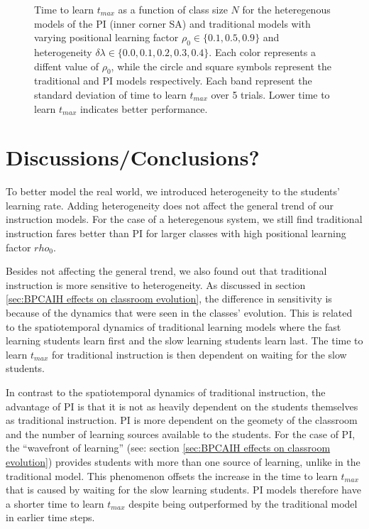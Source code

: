 \begin{figure}[htbp!]
   \caption{Time to learn $t_{max}$ as a function of class size $N$ for the heteregenous models of the PI (inner corner SA) and traditional models with varying positional learning factor $\rho_0\in\lbrace 0.1, 0.5, 0.9 \rbrace$ and heterogeneity $\delta\lambda\in\lbrace0.0, 0.1, 0.2, 0.3, 0.4 \rbrace$. 
   Each color represents a diffent value of $\rho_0$, while the circle and square symbols represent the traditional and PI models respectively.
   Each band represent the standard deviation of time to learn $t_{max}$ over 5 trials.
   Lower time to learn $t_{max}$ indicates better performance.
   }
   \label{fig:2DBPCAIH n-t plots}
\end{figure}

\newpage %



\section{Discussions/Conclusions?}\label{sec:BPCAIH discussions}
To better model the real world, we introduced heterogeneity to the students' learning rate. 
Adding heterogeneity does not affect the general trend of our instruction models. 
For the case of a heteregenous system, we still find traditional instruction fares better than PI for larger classes with high positional learning factor $rho_0$.

Besides not affecting the general trend, we also found out that traditional instruction is more sensitive to heterogeneity. 
As discussed in section \ref{sec:BPCAIH effects on classroom evolution}, the difference in sensitivity is because of the dynamics that were seen in the classes' evolution. 
This is related to the spatiotemporal dynamics of traditional learning models where the fast learning students learn first and the slow learning students learn last.
The time to learn $t_{max}$ for traditional instruction is then dependent on waiting for the slow students.

In contrast to the spatiotemporal dynamics of traditional instruction, the advantage of PI is that it is not as heavily dependent on the students themselves as traditional instruction.
PI is more dependent on the geomety of the classroom and the number of learning sources available to the students.
For the case of PI, the ``wavefront of learning'' (see: section \ref{sec:BPCAIH effects on classroom evolution}) provides students with more than one source of learning, unlike in the traditional model. 
This phenomenon offsets the increase in the time to learn $t_{max}$ that is caused by waiting for the slow learning students.
PI models therefore have a shorter time to learn $t_{max}$ despite being outperformed by the traditional model in earlier time steps.

